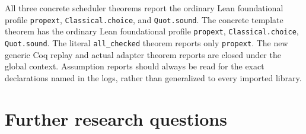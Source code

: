 \documentclass[11pt,letterpaper]{article}
\theoremstyle{definition}
\theoremstyle{remark}
\newcommand{\code}[1]{\texttt{#1}}
\begin{document}
All three concrete scheduler theorems report the ordinary Lean foundational
profile \code{propext}, \code{Classical.choice}, and \code{Quot.sound}.
The concrete template theorem has the ordinary Lean foundational profile
\code{propext}, \code{Classical.choice}, \code{Quot.sound}. The literal
\code{all\_checked} theorem reports only \code{propext}. The new generic
Coq replay and actual adapter theorem reports are closed under the global
context. Assumption reports should always be read for the exact declarations
named in the logs, rather than generalized to every imported library.

\section{Further research questions}
\end{document}
